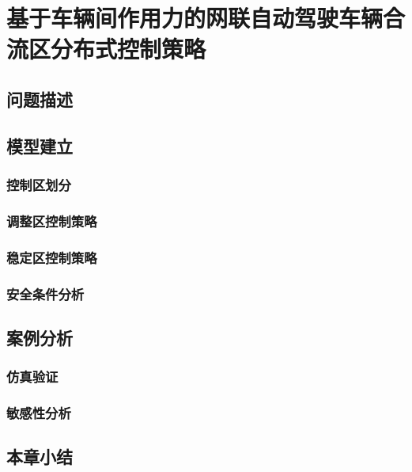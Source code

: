 \chapter{基于车辆间作用力的网联自动驾驶车辆合流区分布式控制策略}
\label{chap:3}

\section{问题描述}

\section{模型建立}

\subsection{控制区划分}

\subsection{调整区控制策略}

\subsection{稳定区控制策略}

\subsection{安全条件分析}

\section{案例分析}

\subsection{仿真验证}

\subsection{敏感性分析}

\section{本章小结}
